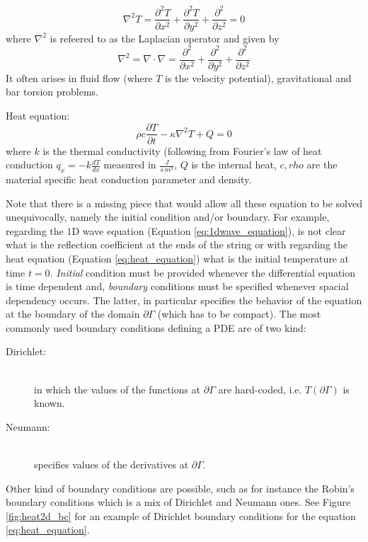 \begin{description}
\begin{descritpion}
     	\begin{equation}
     	\nabla^2T = \frac{\partial^2 T}{\partial x^2} + \frac{\partial^2 T}{\partial y^2}+ \frac{\partial^2}{\partial z^2}=0
     	\end{equation}
     	where $\nabla^2$ is refeered to as the Laplacian operator and given by $$\nabla^2=\nabla \cdot \nabla = \frac{\partial^2}{\partial x^2} + \frac{\partial^2}{\partial y^2} + \frac{\partial^2}{\partial z^2}$$ It often arises in fluid flow (where $T$ is the velocity potential), gravitational and bar torsion problems.
     \item [Heat equation:]\hfil \\  
     	\begin{equation}
     	 \rho c\frac{\partial T}{\partial t} - \kappa \nabla^2T +Q=0
     	\label{eq:heat_equation}
     	\end{equation}
     	where $k$ is the thermal conductivity (following from Fourier's law of heat conduction $q_x=-k\frac{dT}{dx}$ measured in $\frac{J}{s\, m^2}$, $Q$ is the internal heat, $c,rho$ are the material specific heat conduction parameter and density.
   \end{descritpion}
\end{description}

Note that there is a missing piece that would allow all these equation to be solved unequivocally, namely the initial condition and/or boundary. For example, regarding the $1$D wave equation (Equation \ref{eq:1dwave_equation}), is not clear what is the reflection coefficient at the ends of the string or with  regarding the heat equation (Equation \ref{eq:heat_equation}) what is the initial temperature at time $t=0$. 
\textit{Initial} condition must be provided whenever the differential equation is time dependent and, \textit{boundary} conditions must be specified whenever spacial dependency occurs. The latter, in particular specifies the behavior of the equation at the boundary of the domain $\partial \Gamma$ (which has to be compact). The most commonly used boundary conditions defining a PDE are of two kind:
\begin{description}
	\item [Dirichlet:] \hfil \\ in which the values of the functions at $\partial \Gamma$ are hard-coded, i.e. $T(\partial \Gamma)$  is known.
	
	\item [Neumann:] \hfil \\ specifies values of the derivatives at $\partial \Gamma$.
	
\end{description} 
Other kind of boundary conditions are possible, such as for instance the Robin's boundary conditions\cite{Estep:1996:CDE:548037} which is a mix of Dirichlet and Neumann ones. See Figure \ref{fig:heat2d_bc} for an example of Dirichlet boundary conditions for the equation \ref{eq:heat_equation}.


